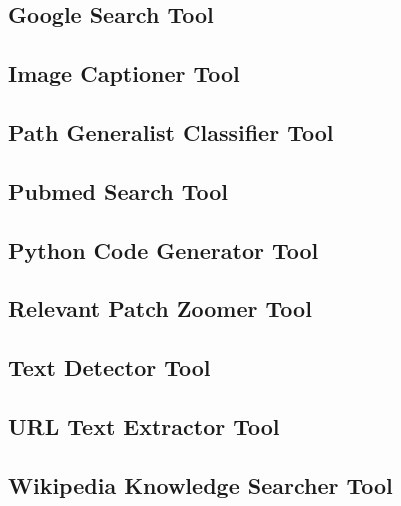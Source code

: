 \subsection{Google Search Tool}
\label{app:google_search_tool}


\subsection{Image Captioner Tool}
\label{app:image_captioner_tool}


\subsection{Path Generalist Classifier Tool}
\label{app:path_generalist_classifier_tool} 


\subsection{Pubmed Search Tool}
\label{app:pubmed_search_tool}


\subsection{Python Code Generator Tool}
\label{app:python_code_generator_tool}


\subsection{Relevant Patch Zoomer Tool}
\label{app:relevant_patch_zoomer_tool}


\subsection{Text Detector Tool}
\label{app:text_detector_tool}


\subsection{URL Text Extractor Tool}
\label{app:url_text_extractor_tool}


\subsection{Wikipedia Knowledge Searcher Tool}
\label{app:wikipedia_knowledge_searcher_tool}


